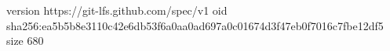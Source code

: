 version https://git-lfs.github.com/spec/v1
oid sha256:ea5b5b8e3110c42e6db53f6a0aa0ad697a0c01674d3f47eb0f7016c7fbe12df5
size 680

